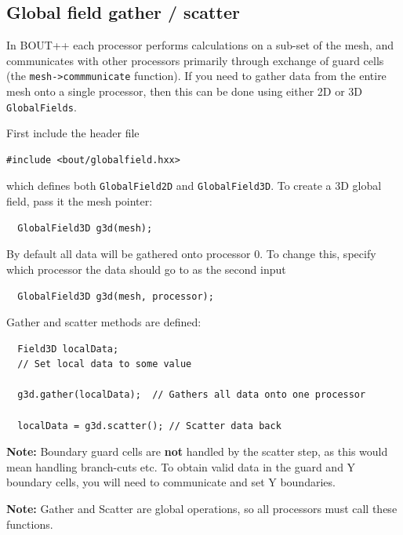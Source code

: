 \documentclass[12pt]{article}
\begin{document}
\subsection{Global field gather / scatter}

In BOUT++ each processor performs calculations on a sub-set of the mesh, and communicates with other
processors primarily through exchange of guard cells (the \lstinline!mesh->commmunicate! function). 
If you need to gather data from the entire mesh onto a single processor, then this can be done
using either 2D or 3D \lstinline!GlobalFields!.  

First include the header file
\begin{lstlisting}
#include <bout/globalfield.hxx>
\end{lstlisting}

which defines both \lstinline!GlobalField2D! and \lstinline!GlobalField3D!. To create a 3D global field,
pass it the mesh pointer:
\begin{lstlisting}
  GlobalField3D g3d(mesh);
\end{lstlisting}
By default all data will be gathered onto processor 0. To change this, specify which processor
the data should go to as the second input
\begin{lstlisting}
  GlobalField3D g3d(mesh, processor);
\end{lstlisting}
Gather and scatter methods are defined:
\begin{lstlisting}
  Field3D localData;
  // Set local data to some value

  g3d.gather(localData);  // Gathers all data onto one processor
  
  localData = g3d.scatter(); // Scatter data back
\end{lstlisting}
{\bf Note:} Boundary guard cells are {\bf not} handled by the scatter step, as this would mean handling
branch-cuts etc. To obtain valid data in the guard and Y boundary cells, you will need to communicate and
set Y boundaries.

{\bf Note:} Gather and Scatter are global operations, so all processors must call these functions.
\end{document}

